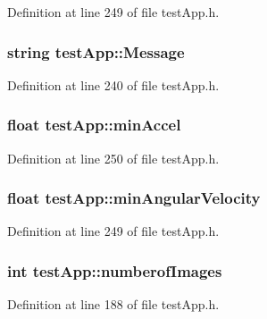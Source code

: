 Definition at line 249 of file test\-App.\-h.

\hypertarget{classtest_app_a0124035d0454fb6bd9152f8a87c40677}{
\subsubsection[{Message}]{\setlength{\rightskip}{0pt plus 5cm}string test\-App\-::\-Message}}\label{classtest_app_a0124035d0454fb6bd9152f8a87c40677}


Definition at line 240 of file test\-App.\-h.

\hypertarget{classtest_app_ab007edbc20b09d607f8010e2dbafdb97}{
\subsubsection[{min\-Accel}]{\setlength{\rightskip}{0pt plus 5cm}float test\-App\-::min\-Accel}}\label{classtest_app_ab007edbc20b09d607f8010e2dbafdb97}


Definition at line 250 of file test\-App.\-h.

\hypertarget{classtest_app_ac559756a01e0b98378bc29dfba9fac79}{
\subsubsection[{min\-Angular\-Velocity}]{\setlength{\rightskip}{0pt plus 5cm}float test\-App\-::min\-Angular\-Velocity}}\label{classtest_app_ac559756a01e0b98378bc29dfba9fac79}


Definition at line 249 of file test\-App.\-h.

\hypertarget{classtest_app_a957cf7fdb3ea964a88ca1be13e4d68fc}{
\subsubsection[{numberof\-Images}]{\setlength{\rightskip}{0pt plus 5cm}int test\-App\-::numberof\-Images}}\label{classtest_app_a957cf7fdb3ea964a88ca1be13e4d68fc}


Definition at line 188 of file test\-App.\-h.

